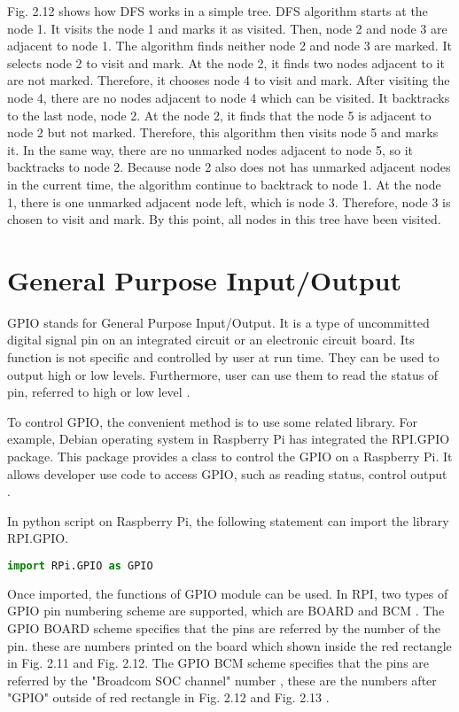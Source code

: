 \documentclass[11pt,times,oneside,openright,hardcopy]{eeereport}
\begin{document}
Fig. 2.12 shows how DFS works in a simple tree. DFS algorithm starts at the node 1. It visits the node 1 and marks it as visited. Then, node 2 and node 3 are adjacent to node 1.
The algorithm finds neither node 2 and node 3 are marked. It selects node 2 to visit and mark. At the node 2, it finds two nodes adjacent to it are not marked. Therefore, it chooses node 4 to visit and mark.
After visiting the node 4, there are no nodes adjacent to node 4 which can be visited. It backtracks to the last node, node 2. At the node 2, it finds that the node 5 is adjacent to node 2 but not marked. Therefore, this algorithm then visits node 5 and marks it.
In the same way, there are no unmarked nodes adjacent to node 5, so it backtracks to node 2. Because node 2 also does not has unmarked adjacent nodes in the current time, the algorithm continue to backtrack to node 1.
At the node 1, there is one unmarked adjacent node left, which is node 3. Therefore, node 3 is chosen to visit and mark.
By this point, all nodes in this tree have been visited.





\section{General Purpose Input/Output}
GPIO stands for General Purpose Input/Output. It is a type of uncommitted digital signal pin on an integrated circuit or an electronic circuit board. 
Its function is not specific and controlled by user at run time. They can be used to output high or low levels. Furthermore, user can use them to read the status of pin, referred to high or low level \cite{Sun:2016cw}.

To control GPIO, the convenient method is to use some related library. For example, Debian operating system in Raspberry Pi has integrated the RPI.GPIO package.
This package provides a class to control the GPIO on a Raspberry Pi. It allows developer use code to access GPIO, such as reading status, control output \cite{Gay:2018wa}.

In python script on Raspberry Pi, the following statement can import the library RPI.GPIO.

\begin{lstlisting}[language=Python]
    import RPi.GPIO as GPIO
\end{lstlisting}

Once imported, the functions of GPIO module can be used. In RPI, two types of GPIO pin numbering scheme are supported, which are BOARD and BCM \cite{Kurniawan:tw}.
The GPIO BOARD scheme specifies that the pins are referred by the number of the pin.
these are numbers printed on the board which shown inside the red rectangle in Fig. 2.11 and Fig. 2.12.
The GPIO BCM scheme specifies that the pins are referred by the "Broadcom SOC channel" number \cite{Shah:2015uh}, these are the numbers after "GPIO" outside of red rectangle in Fig. 2.12 and Fig. 2.13 \cite{Hoffstadt:2016im}.
\end{document}
